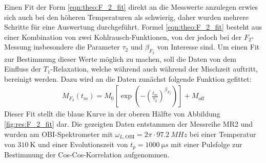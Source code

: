 Einen Fit der Form \eqref{eqn:theo:F_2_fit} direkt an die Messwerte anzulegen erwies sich auch bei den höheren Temperaturen als schwierig, daher wurden mehrere Schritte für eine Auswertung durchgeführt. Formel \eqref{eqn:theo:F_2_fit} besteht aus einer Kombination von zwei Kohlrausch-Funktionen, von der jedoch bei der $F_2$-Messung insbesondere die Parameter $\tau_2$ und $\beta_{F_2}$ von Interesse sind. Um einen Fit zur Bestimmung dieser Werte möglich zu machen, soll die Daten von dem Einfluss der $T_1$-Relaxation, welche während auch während der Mischzeit auftritt, bereinigt werden. Dazu wird an die Daten zunächst folgende Funktion gefittet:
\begin{align}
	M_{F_2} (t_m) = M_0 \left[ \exp{ \left(- { \left( \frac{t_m}{\tau_2} \right) }^{\beta_{F_2}} \right)} \right] + M_\text{off} \label{eqn:res:F_2_fit}
\end{align}
Dieser Fit stellt die blaue Kurve in der oberen Hälfte von Abbildung \ref{fig:res:F_2_fit} dar. Die gezeigten Daten entstammen der Messreihe MR2 und wurden am OBI-Spektrometer mit $\omega_{L, \text{OBI}} = 2\pi \cdot \SI{97.2}{MHz}$ bei einer Temperatur von $\SI{310}{\kelvin}$ und einer Evolutionszeit von $t_p = \SI{1000}{\micro s}$ mit einer Pulsfolge zur Bestimmung der Cos-Cos-Korrelation aufgenommen.
